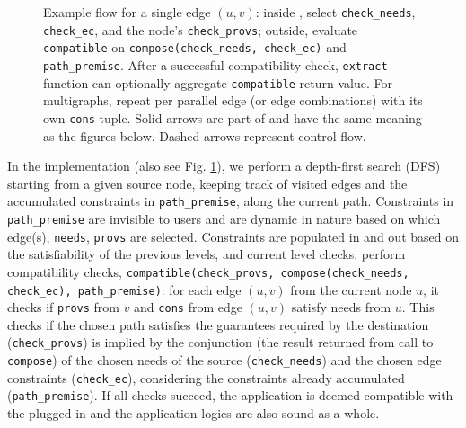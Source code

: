 \begin{figure}
\begin{tikzpicture}
\end{tikzpicture}
\vspace{-0.1in}
        \caption{Example flow for a single edge $(u,v)$: inside \sysgraph, select \texttt{check\_needs}, \texttt{check\_ec}, and the node’s \texttt{check\_provs}; outside, evaluate \texttt{compatible} on \texttt{compose(check\_needs, check\_ec)} and \texttt{path\_premise}. After a successful compatibility check, \texttt{extract} function can optionally aggregate \texttt{compatible} return value. For multigraphs, repeat per parallel edge (or edge combinations) with its own \texttt{cons} tuple. Solid arrows are part of \sysgraph and have the same meaning as the figures below. Dashed arrows represent control flow.}
\label{fig:skel}
\end{figure}


In the implementation (also see Fig. \ref{fig:skel}), we perform a depth-first search (DFS) starting from a
given source node, keeping track of visited edges and the accumulated
constraints in \texttt{path\_premise}, along the current path.
Constraints in \texttt{path\_premise} are invisible to users and are dynamic in nature based on which
edge(s), \texttt{needs}, \texttt{provs} are selected. Constraints are populated in and out
based on the satisfiability of the previous levels, and current level checks.
\sysname{} perform compatibility checks, \texttt{compatible(check\_provs,
compose(check\_needs, check\_ec), path\_premise)}:
for each edge $(u, v)$ from the current node $u$, it checks if \texttt{provs} from $v$
and \texttt{cons} from edge $(u, v)$ satisfy needs from $u$.
This checks if the chosen path satisfies the guarantees required by the destination
(\texttt{check\_provs}) is
implied by the conjunction (the result returned from call to \texttt{compose}) of the chosen needs of the
source (\texttt{check\_needs}) and the chosen edge constraints
(\texttt{check\_ec}),
considering the constraints already accumulated (\texttt{path\_premise}).
If all checks succeed, the application is deemed compatible
with the plugged-in \sysmods{} and the application logics are also
sound as a whole.


